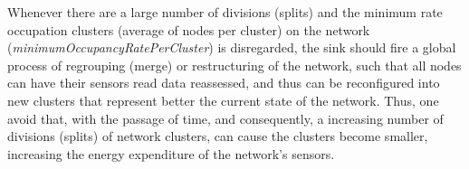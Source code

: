 \documentclass[conference]{IEEEtran}
\begin{document}

Whenever there are a large number of divisions (splits) and the minimum rate
occupation clusters (average of nodes per cluster) on the network
(\textit{minimumOccupancyRatePerCluster}) is disregarded, the sink should fire a
global process of regrouping (merge) or restructuring of the network, such that
all nodes can have their sensors read data reassessed, and thus can be
reconfigured into new clusters that represent better the current state of the
network. Thus, one avoid that, with the passage of time, and consequently, a
increasing number of divisions (splits) of network clusters, can cause the
clusters become smaller, increasing the energy expenditure of the network's
sensors.

% 
\end{document}

